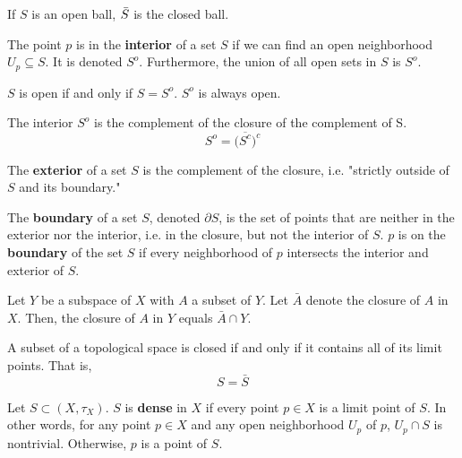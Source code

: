     \begin{example}
    If $S$ is an open ball, $\Bar{S}$ is the closed ball. 
    \end{example}

    \begin{definition}
    The point $p$ is in the \textbf{interior} of a set $S$ if we can find an open neighborhood $U_p \subseteq S$. It is denoted $S^{o}$. Furthermore, the union of all open sets in $S$ is $S^{o}$. 
    \end{definition}

    \begin{proposition}
    $S$ is open if and only if $S = S^{o}$. $S^{o}$ is always open.
    \end{proposition}

    \begin{theorem}
    The interior $S^{o}$ is the complement of the closure of the complement of S. \[ S^{o} = \big(\overline{S^{c}}\big)^{c}\]
    \end{theorem}

    \begin{definition}
    The \textbf{exterior} of a set $S$ is the complement of the closure, i.e. "strictly outside of $S$ and its boundary."
    \end{definition}

    \begin{definition}
    The \textbf{boundary} of a set $S$, denoted $\partial S$, is the set of points that are neither in the exterior nor the interior, i.e. in the closure, but not the interior of $S$. $p$ is on the \textbf{boundary} of the set $S$ if every neighborhood of $p$ intersects the interior and exterior of $S$.  
    \end{definition}

    \begin{theorem}
    Let $Y$ be a subspace of $X$ with $A$ a subset of $Y$. Let $\bar{A}$ denote the closure of $A$ in $X$. Then, the closure of $A$ in $Y$ equals $\bar{A} \cap Y$. 
    \end{theorem}

    \begin{theorem}
    A subset of a topological space is closed if and only if it contains all of its limit points. That is, 
    \[S = \bar{S}\]
    \end{theorem}

    \begin{definition}
    Let $S \subset (X, \tau_X)$. $S$ is \textbf{dense} in $X$ if every point $p \in X$ is a limit point of $S$. In other words, for any point $p \in X$ and any open neighborhood $U_p$ of $p$, $U_p \cap S$ is nontrivial. Otherwise, $p$ is a point of $S$. 
    \end{definition}

